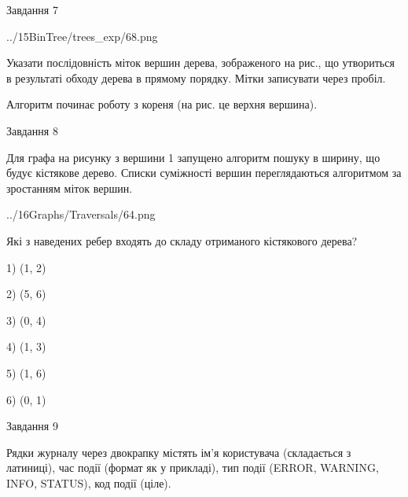 \documentclass[12pt, ukrainian]{article}
\begin{document}
{\vspace{10mm}\par

\newpage
\begin{minipage}[t]{9.7cm}
               
{\begin{center}Завдання {7}\end{center}}
\vspace{-4mm}

\begin{center}
	{../15BinTree/trees_exp/68.png}
\end{center}
Указати послідовність міток вершин дерева, зображеного на рис., що утвориться в результаті обходу дерева в прямому порядку. Мітки записувати через пробіл.\par Алгоритм починає роботу з кореня (на рис. це верхня вершина).\par

\end{minipage}
\vline \hspace{8mm}
\begin{minipage}[t]{8.0cm}
               
{\begin{center}Завдання {8}\end{center}}
\vspace{-4mm}
Для графа на рисунку з вершини 1 запущено алгоритм пошуку в ширину, що будує кістякове дерево. Списки суміжності вершин переглядаються алгоритмом за зростанням міток вершин.\par
\begin{center}
	{../16Graphs/Traversals/64.png}
\end{center}
\par Які з наведених ребер входять до складу отриманого кістякового дерева?\par
1) (1, 2)\par
2) (5, 6)\par
3) (0, 4)\par
4) (1, 3)\par
5) (1, 6)\par
6) (0, 1)\par
{\vskip 15pt} \par

\end{minipage}

               
{\begin{center}Завдання {9}\end{center}}
\vspace{-4mm}
Рядки журналу через двокрапку містять ім'я користувача (складається з латиниці), час події (фор\-мат як у прикладі), тип події (ERROR, WARNING, INFO, STATUS), код події (ціле).

}
\end{document}
